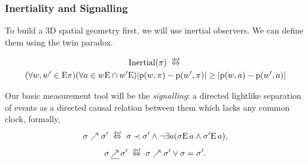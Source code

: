 \documentclass[xcolor=x11names]{beamer}
\newcommand{\future}{\prec}
\newcommand{\llfuture}{\nearrow}
\newcommand{\llfutureeq}{\mathop{\underline\nearrow}}
\newcommand{\defekv}[1][.1]{\hspace{#1cm}\overset{\textup{\tiny def}}{ \Leftrightarrow }\hspace{#1cm}}
\newcommand{\forallin}[2]{(\forall #1 \in #2)}
\newcommand{\Pointsf}{\mathrm{p}}
\newcommand{\Ex}{\mathrm{E}}
\begin{document}
\begin{frame}[t]
\frametitle{Inertiality and Signalling}
\footnotesize
To build a 3D spatial geometry first, we will use inertial observers. We can define them using the twin paradox.

\begin{multline*}
\mathrm{Inertial}(\pi) \defekv \\ \forallin {w,w'}{\Ex\pi}\forallin a{w \Ex \cap w'\Ex}
 |\Pointsf (w,\pi )- \Pointsf (w',\pi )|\geq |\Pointsf (w,a )- \Pointsf (w',a )|
\end{multline*}

Our basic measurement tool will be the \emph{signalling}: a directed lightlike separation of events as a directed causal relation between them which lacks any common clock, formally,
\[\sigma\llfuture \sigma' \defekv \sigma \future \sigma' \land \lnot \exists a (\sigma\Ex\, a \land \sigma'\Ex \,a), \]
\[\sigma\llfutureeq \sigma' \defekv \sigma \llfuture \sigma' \lor \sigma=\sigma'. \]

\end{frame}
\end{document}
